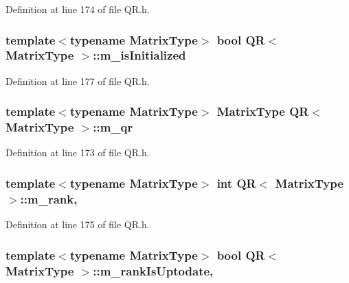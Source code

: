 Definition at line 174 of file Q\-R.\-h.

\hypertarget{class_q_r_a568228d6ec9df26483477813513de7e2}{
\subsubsection[{m\-\_\-is\-Initialized}]{\setlength{\rightskip}{0pt plus 5cm}template$<$typename Matrix\-Type$>$ bool {\bf Q\-R}$<$ Matrix\-Type $>$\-::m\-\_\-is\-Initialized\hspace{0.3cm}{\ttfamily [protected]}}}\label{class_q_r_a568228d6ec9df26483477813513de7e2}


Definition at line 177 of file Q\-R.\-h.

\hypertarget{class_q_r_a1f658834aa974fed1da1013419bacf33}{
\subsubsection[{m\-\_\-qr}]{\setlength{\rightskip}{0pt plus 5cm}template$<$typename Matrix\-Type$>$ Matrix\-Type {\bf Q\-R}$<$ Matrix\-Type $>$\-::m\-\_\-qr\hspace{0.3cm}{\ttfamily [protected]}}}\label{class_q_r_a1f658834aa974fed1da1013419bacf33}


Definition at line 173 of file Q\-R.\-h.

\hypertarget{class_q_r_a1d766c7db1a2d88a21792d137a9a54b6}{
\subsubsection[{m\-\_\-rank}]{\setlength{\rightskip}{0pt plus 5cm}template$<$typename Matrix\-Type$>$ {\bf int} {\bf Q\-R}$<$ Matrix\-Type $>$\-::m\-\_\-rank\hspace{0.3cm}{\ttfamily [mutable]}, {\ttfamily [protected]}}}\label{class_q_r_a1d766c7db1a2d88a21792d137a9a54b6}


Definition at line 175 of file Q\-R.\-h.

\hypertarget{class_q_r_a18cd3edcb85f36b4f3abad192d90de9f}{
\subsubsection[{m\-\_\-rank\-Is\-Uptodate}]{\setlength{\rightskip}{0pt plus 5cm}template$<$typename Matrix\-Type$>$ bool {\bf Q\-R}$<$ Matrix\-Type $>$\-::m\-\_\-rank\-Is\-Uptodate\hspace{0.3cm}{\ttfamily [mutable]}, {\ttfamily [protected]}}}\label{class_q_r_a18cd3edcb85f36b4f3abad192d90de9f}



